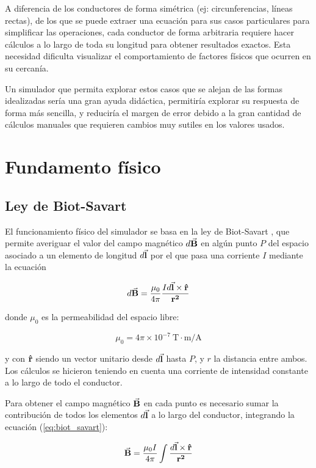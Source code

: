 \documentclass[12pt,a4paper]{article}
\begin{document}
A diferencia de los conductores de forma simétrica (ej: circunferencias, líneas rectas), de los que se puede extraer una ecuación para sus casos particulares para simplificar las operaciones, cada conductor de forma arbitraria requiere hacer cálculos a lo largo de toda su longitud para obtener resultados exactos. Esta necesidad dificulta visualizar el comportamiento de factores físicos que ocurren en su cercanía.

Un simulador que permita explorar estos casos que se alejan de las formas idealizadas sería una gran ayuda didáctica, permitiría explorar su respuesta de forma más sencilla, y reduciría el margen de error debido a la gran cantidad de cálculos manuales que requieren cambios muy sutiles en los valores usados.

\section{Fundamento físico}
\subsection{Ley de Biot-Savart}
El funcionamiento físico del simulador se basa en la ley de Biot-Savart \cite{serway}, que permite averiguar el valor del campo magnético $d\va{B}$ en algún punto $P$ del espacio asociado a un elemento de longitud $d \va{l}$ por el que pasa una corriente $I$ mediante la ecuación

\begin{equation} \label{eq:biot_savart}
    d\va{B} = \frac{\mu_0}{4 \pi} \frac{I d \va{l} \times \vu{r}}{\vb{r^2}}
\end{equation}

donde $\mu_0$ es la permeabilidad del espacio libre:

\begin{equation}
    \mu_0 =  4\pi \times 10^{-7} \ \mathrm{T \cdot m / A}
\end{equation}

y con $\vu{r}$ siendo un vector unitario desde $d \va{l}$ hasta $P$, y $r$ la distancia entre ambos. Los cálculos se hicieron teniendo en cuenta una corriente de intensidad constante a lo largo de todo el conductor.

Para obtener el campo magnético $\va{B}$ en cada punto es necesario sumar la contribución de todos los elementos $d\va{l}$ a lo largo del conductor, integrando la ecuación (\ref{eq:biot_savart}):

\begin{equation}
    \va{B} = \frac{\mu_0 I}{4 \pi} \int \frac{d \va{l} \times \vu{r}}{\vb{r^2}}
\end{equation}
\end{document}
